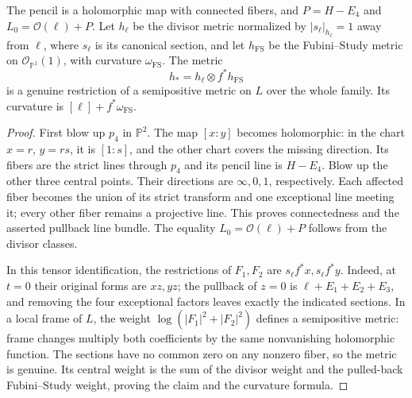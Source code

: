\begin{lemma}\label{lem:four-point-pencil-reference}
The pencil is a holomorphic map with connected fibers, and $P=H-E_4$ and $L_0=\mathcal O(\ell)+P$. Let $h_\ell$ be the divisor metric normalized by $|s_\ell|_{h_\ell}=1$ away from $\ell$, where $s_\ell$ is its canonical section, and let $h_{\mathrm{FS}}$ be the Fubini--Study metric on $\mathcal O_{\mathbb P^1}(1)$, with curvature $\omega_{\mathrm{FS}}$. The metric
\[
 h_*=h_\ell\otimes f^*h_{\mathrm{FS}}
\]
is a genuine restriction of a semipositive metric on $L$ over the whole family. Its curvature is $[\ell]+f^*\omega_{\mathrm{FS}}$.
\end{lemma}
\begin{proof}
First blow up $p_4$ in $\mathbb P^2$. The map $[x:y]$ becomes holomorphic: in the chart $x=r$, $y=rs$, it is $[1:s]$, and the other chart covers the missing direction. Its fibers are the strict lines through $p_4$ and its pencil line is $H-E_4$. Blow up the other three central points. Their directions are $\infty,0,1$, respectively. Each affected fiber becomes the union of its strict transform and one exceptional line meeting it; every other fiber remains a projective line. This proves connectedness and the asserted pullback line bundle. The equality $L_0=\mathcal O(\ell)+P$ follows from the divisor classes.

In this tensor identification, the restrictions of $F_1,F_2$ are $s_\ell f^*x,s_\ell f^*y$. Indeed, at $t=0$ their original forms are $xz,yz$; the pullback of $z=0$ is $\ell+E_1+E_2+E_3$, and removing the four exceptional factors leaves exactly the indicated sections. In a local frame of $L$, the weight $\log(|F_1|^2+|F_2|^2)$ defines a semipositive metric: frame changes multiply both coefficients by the same nonvanishing holomorphic function. The sections have no common zero on any nonzero fiber, so the metric is genuine. Its central weight is the sum of the divisor weight and the pulled-back Fubini--Study weight, proving the claim and the curvature formula.
\end{proof}

